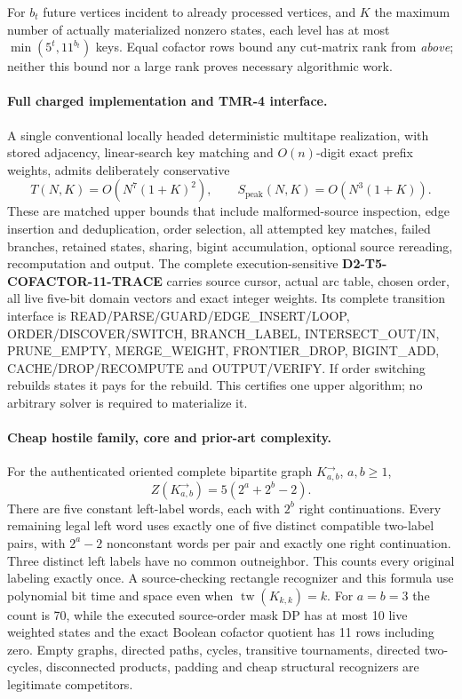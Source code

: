 \documentclass[11pt]{article}
\begin{document}
For $b_t$ future vertices incident to already processed
vertices, and $K$ the maximum number of actually
materialized nonzero states, each level has
at most $\min(5^t,11^{b_t})$ keys.
Equal cofactor rows bound any cut-matrix rank from
\emph{above}; neither this bound nor a large rank
proves necessary algorithmic work.

\paragraph{Full charged implementation and TMR-4 interface.}
A single conventional locally headed deterministic
multitape realization, with stored adjacency,
linear-search key matching and $O(n)$-digit exact
prefix weights, admits deliberately conservative
\[
T(N,K)=O(N^7(1+K)^2),\qquad
S_{\mathrm{peak}}(N,K)=O(N^3(1+K)).
\]
These are matched upper bounds that include
malformed-source inspection, edge insertion and
deduplication, order selection, all attempted
key matches, failed branches, retained states,
sharing, bigint accumulation, optional source
rereading, recomputation and output.
The complete execution-sensitive
\textbf{D2-T5-COFACTOR-11-TRACE} carries source cursor,
actual arc table, chosen order, all live five-bit
domain vectors and exact integer weights.
Its complete transition interface is
READ/PARSE/GUARD/EDGE\_INSERT/LOOP,
ORDER/DISCOVER/SWITCH,
BRANCH\_LABEL, INTERSECT\_OUT/IN,
PRUNE\_EMPTY, MERGE\_WEIGHT,
FRONTIER\_DROP, BIGINT\_ADD,
CACHE/DROP/RECOMPUTE and OUTPUT/VERIFY.
If order switching rebuilds states it pays for
the rebuild. This certifies one upper algorithm;
no arbitrary solver is required to materialize it.

\paragraph{Cheap hostile family, core and prior-art complexity.}
For the authenticated oriented complete bipartite
graph $K_{a,b}^{\rightarrow}$, $a,b\ge1$,
\[
\boxed{Z(K_{a,b}^{\rightarrow})
=5(2^a+2^b-2).}
\]
There are five constant left-label words, each with
$2^b$ right continuations. Every remaining legal left
word uses exactly one of five distinct compatible
two-label pairs, with $2^a-2$ nonconstant words per pair
and exactly one right continuation. Three distinct
left labels have no common outneighbor. This counts
every original labeling exactly once. A source-checking
rectangle recognizer and this formula use polynomial
bit time and space even when
$\operatorname{tw}(K_{k,k})=k$.
For $a=b=3$ the count is 70, while the executed
source-order mask DP has at most 10 live weighted
states and the exact Boolean cofactor quotient has
11 rows including zero.
Empty graphs, directed paths, cycles, transitive
tournaments, directed two-cycles, disconnected
products, padding and cheap structural
recognizers are legitimate competitors.
\end{document}
